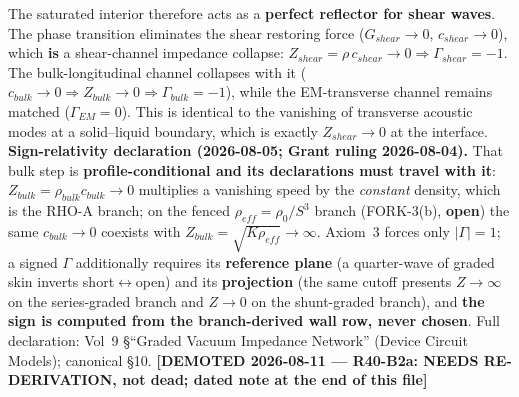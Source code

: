 The saturated interior therefore acts as a \textbf{perfect reflector for shear waves}. The phase transition eliminates the shear restoring force ($G_{shear} \to 0$, $c_{shear} \to 0$), which \textbf{is} a shear-channel impedance collapse: $Z_{shear} = \rho\,c_{shear} \to 0 \Rightarrow \Gamma_{shear} = -1$. The bulk-longitudinal channel collapses with it ($c_{bulk} \to 0 \Rightarrow Z_{bulk} \to 0 \Rightarrow \Gamma_{bulk} = -1$), while the EM-transverse channel remains matched ($\Gamma_{EM} = 0$). This is identical to the vanishing of transverse acoustic modes at a solid--liquid boundary, which is exactly $Z_{shear} \to 0$ at the interface. \textbf{Sign-relativity declaration (2026-08-05; Grant ruling 2026-08-04).} That bulk step is \textbf{profile-conditional and its declarations must travel with it}: $Z_{bulk} = \rho_{bulk} c_{bulk} \to 0$ multiplies a vanishing speed by the \emph{constant} density, which is the RHO-A branch; on the fenced $\rho_{eff} = \rho_0/S^3$ branch (FORK-3(b), \textbf{open}) the same $c_{bulk} \to 0$ coexists with $Z_{bulk} = \sqrt{K\rho_{eff}} \to \infty$. Axiom~3 forces only $|\Gamma| = 1$\gammaundeclared{}; a signed $\Gamma$ additionally requires its \textbf{reference plane} (a quarter-wave of graded skin inverts short$\leftrightarrow$open) and its \textbf{projection} (the same cutoff presents $Z \to \infty$ on the series-graded branch and $Z \to 0$ on the shunt-graded branch), and \textbf{the sign is computed from the branch-derived wall row, never chosen}. Full declaration: Vol~9 \S``Graded Vacuum Impedance Network'' (Device Circuit Models); canonical  \S10. \textbf{[DEMOTED 2026-08-11 --- R40-B2a: NEEDS RE-DERIVATION, not dead; dated note at the end of this file]}

